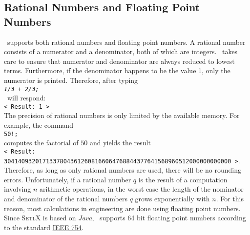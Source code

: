 \subsection{Rational Numbers and Floating Point Numbers}
\setlx\ supports both rational numbers and floating point numbers.
A rational number consists of a numerator and a denominator, both of which are integers.  \setlx\ takes care to
ensure that numerator and denominator are always reduced to lowest terms.  Furthermore, if the
denominator happens to be the value 1, only the numerator is printed.  Therefore, after typing
\\[0.2cm]
\hspace*{1.3cm}
\texttt{\textsl{1/3 + 2/3;}}
\\[0.2cm]
\setlx\ will respond:
\\[0.2cm]
\hspace*{1.3cm}
\texttt{< Result: 1 >}
\\[0.2cm]
The precision of rational numbers is only limited by the available memory.  For example, the command
\\[0.2cm]
\hspace*{1.3cm}
\texttt{50!;}
\\[0.2cm]
computes the factorial of $50$ and yields the result
\\[0.2cm]
\hspace*{0.1cm}
\texttt{< Result: 30414093201713378043612608166064768844377641568960512000000000000 >}.
\\[0.2cm]
Therefore, as long as only rational numbers are used, there will be no rounding errors.
Unfortunately, if a rational number $q$ is the result of a computation involving $n$ arithmetic
operations, in the worst case the length of the nominator and denominator of the rational numbers
$q$ grows exponentially with $n$.  For this reason, most calculations in engineering are
done using floating point numbers.  Since \textsc{SetlX} is based on \textsl{Java}, \setlx\ supports
64 bit floating point numbers according to the standard
\href{https://en.wikipedia.org/wiki/IEEE_floating_point}{IEEE 754}. 


